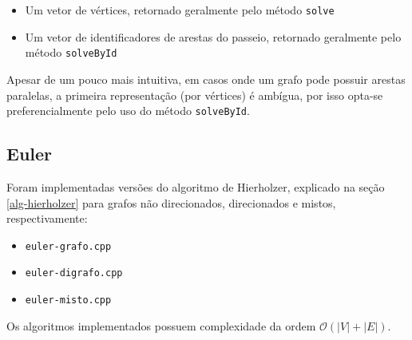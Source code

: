 \begin{itemize}
    \item Um vetor de vértices, retornado geralmente pelo método \texttt{solve}
    \item Um vetor de identificadores de arestas do passeio, retornado geralmente pelo método \texttt{solveById}
\end{itemize}

Apesar de um pouco mais intuitiva, em casos onde um grafo pode possuir arestas paralelas, a primeira representação (por vértices) é ambígua, por isso opta-se preferencialmente pelo uso do método \texttt{solveById}.

\subsection{Euler}

Foram implementadas versões do algoritmo de Hierholzer, explicado na seção \ref{alg-hierholzer} para grafos não direcionados, direcionados e mistos, respectivamente:


\begin{itemize}
    \item \texttt{euler-grafo.cpp}
    \item \texttt{euler-digrafo.cpp}
    \item \texttt{euler-misto.cpp}
\end{itemize}

Os algoritmos implementados possuem complexidade da ordem $\mathcal{O}(|V| + |E|)$.

